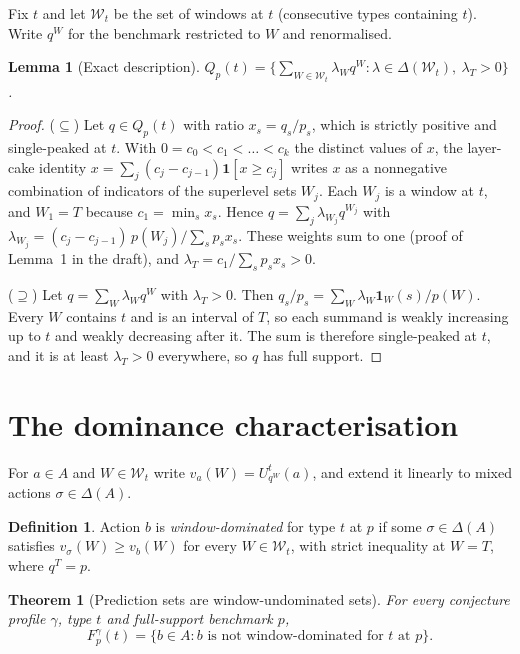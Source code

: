 \documentclass[11pt]{article}
\newtheorem{theorem}{Theorem}
\newtheorem{lemma}{Lemma}
\theoremstyle{definition}
\newtheorem{definition}{Definition}
\begin{document}
Fix $t$ and let $\mathcal W_t$ be the set of windows at $t$ (consecutive types
containing $t$). Write $q^W$ for the benchmark restricted to $W$ and renormalised.

\begin{lemma}[Exact description]\label{lem:exact}
$Q_p(t) = \bigl\{ \sum_{W \in \mathcal W_t} \lambda_W q^W : \lambda \in \Delta(\mathcal W_t),\ \lambda_T > 0 \bigr\}$.
\end{lemma}

\begin{proof}
($\subseteq$) Let $q \in Q_p(t)$ with ratio $x_s = q_s/p_s$, which is strictly positive and
single-peaked at $t$. With $0 = c_0 < c_1 < \dots < c_k$ the distinct values of $x$,
the layer-cake identity $x = \sum_j (c_j - c_{j-1}) \mathbf 1[x \ge c_j]$ writes $x$ as a
nonnegative combination of indicators of the superlevel sets $W_j$. Each $W_j$ is a
window at $t$, and $W_1 = T$ because $c_1 = \min_s x_s$. Hence
$q = \sum_j \lambda_{W_j} q^{W_j}$ with
$\lambda_{W_j} = (c_j - c_{j-1})\,p(W_j) / \sum_s p_s x_s$. These weights sum to one
(proof of Lemma~1 in the draft), and $\lambda_T = c_1 / \sum_s p_s x_s > 0$.

($\supseteq$) Let $q = \sum_W \lambda_W q^W$ with $\lambda_T > 0$. Then
$q_s/p_s = \sum_W \lambda_W \mathbf 1_W(s)/p(W)$. Every $W$ contains $t$ and is an
interval of $T$, so each summand is weakly increasing up to $t$ and weakly
decreasing after it. The sum is therefore single-peaked at $t$, and it is at least
$\lambda_T > 0$ everywhere, so $q$ has full support.
\end{proof}

\section*{The dominance characterisation}

For $a \in A$ and $W \in \mathcal W_t$ write $v_a(W) = U^t_{q^W}(a)$, and extend it
linearly to mixed actions $\sigma \in \Delta(A)$.

\begin{definition}
Action $b$ is \emph{window-dominated} for type $t$ at $p$ if some $\sigma \in \Delta(A)$
satisfies $v_\sigma(W) \ge v_b(W)$ for every $W \in \mathcal W_t$, with strict
inequality at $W = T$, where $q^T = p$.
\end{definition}

\begin{theorem}[Prediction sets are window-undominated sets]\label{th:dual}
For every conjecture profile $\gamma$, type $t$ and full-support benchmark $p$,
\[
F^\gamma_p(t) = \{ b \in A : b \text{ is not window-dominated for } t \text{ at } p \}.
\]
\end{theorem}
\end{document}
